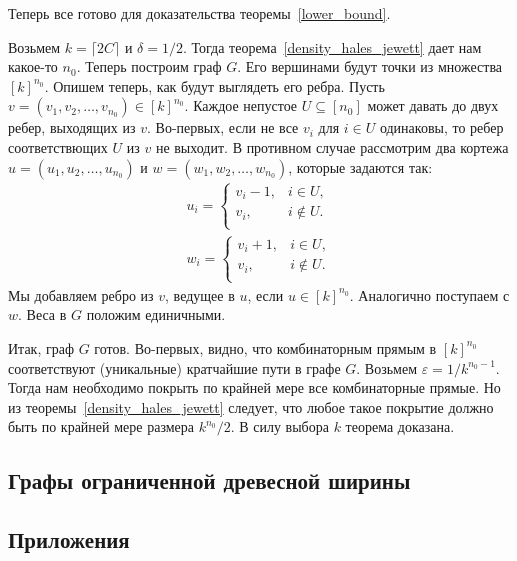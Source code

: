 \documentclass[12pt]{article}
\begin{document}
    Теперь все готово для доказательства теоремы~\ref{lower_bound}.

    Возьмем $k = \lceil 2C \rceil$ и $\delta = 1/2$. Тогда теорема~\ref{density_hales_jewett}
    дает нам какое-то $n_0$. Теперь построим граф $G$. Его вершинами будут точки из множества
    $[k]^{n_0}$.
    Опишем теперь, как будут выглядеть его ребра. Пусть $v = (v_1, v_2, \ldots, v_{n_0}) \in [k]^{n_0}$.
    Каждое непустое $U \subseteq [n_0]$ может давать до двух ребер, выходящих из $v$.
    Во-первых, если не все $v_i$ для $i \in U$ одинаковы, то ребер соответствющих $U$ из $v$
    не выходит.
    В противном случае рассмотрим два кортежа
    $u = (u_1, u_2, \ldots, u_{n_0})$ и $w = (w_1, w_2, \ldots, w_{n_0})$,
    которые задаются так:
    \begin{eqnarray*}
        u_i = \begin{cases}
            v_i - 1, & i \in U,\\
            v_i, & i \notin U.\\
        \end{cases}\\
        w_i = \begin{cases}
            v_i + 1, & i \in U,\\
            v_i, & i \notin U.\\
        \end{cases}
    \end{eqnarray*}
    Мы добавляем ребро из $v$, ведущее в $u$, если $u \in [k]^{n_0}$. Аналогично поступаем с $w$.
    Веса в $G$ положим единичными.

    Итак, граф $G$ готов.
    Во-первых, видно, что комбинаторным прямым в $[k]^{n_0}$ соответствуют (уникальные) кратчайшие пути в графе $G$.
    Возьмем $\varepsilon = 1 / k^{n_0-1}$. Тогда нам необходимо покрыть по крайней мере
    все комбинаторные прямые.
    Но из теоремы~\ref{density_hales_jewett} следует,
    что любое такое покрытие должно быть по крайней мере размера
    $k^{n_0} / 2$. В силу выбора $k$ теорема доказана.

    \subsection{Графы ограниченной древесной ширины}
    \label{subsection_bounded_treewidth}
    \subsection{Приложения}
    \label{subsection_applications}
\end{document}
